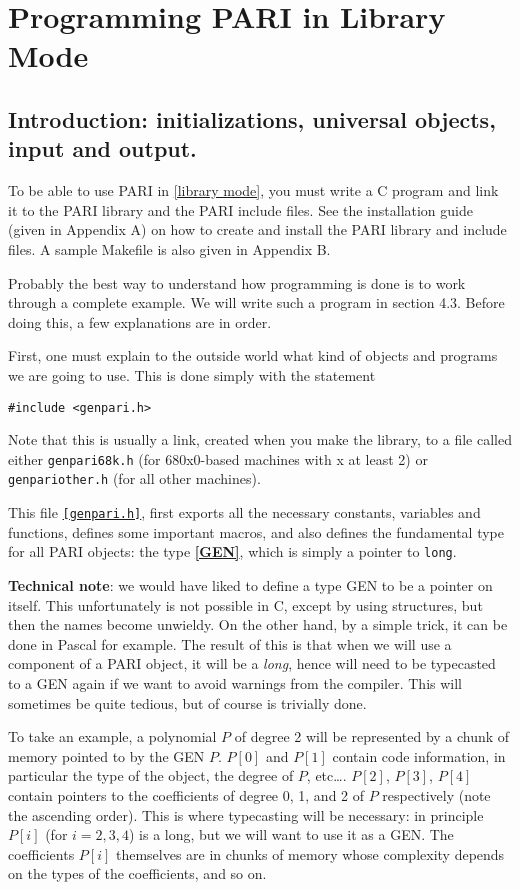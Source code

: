 \chapter{Programming PARI in Library Mode}

\section{Introduction: initializations, universal objects, input and output.}

To be able to use PARI in \ref{library mode}, you must write a C program and link it
to the PARI library and the PARI include files. See the installation guide 
(given in Appendix A) on how to create and install the PARI
library and include files. A sample Makefile is also given in Appendix B.

Probably the best way to understand how programming is done is to work
through a complete example. We will write such a program in section 4.3.
Before doing this, a few explanations are in order.


First, one must explain to the outside world what kind of objects and
programs we are going to use. This is done simply with the statement

{\tt \#include <genpari.h>}

Note that this is usually a link, created when you make the library, to
a file called either {\tt genpari68k.h} (for 680x0-based machines with x at
least 2) or {\tt genpariother.h} (for all other machines).

This file {\tt \ref{genpari.h}}, first exports all the necessary constants, variables
and functions, defines some important macros, and also defines the fundamental
type for all PARI objects: the type {\bf \ref{GEN}}, which is simply
a pointer to {\tt long}.

{\bf Technical note}: we would have liked to define a type GEN to be a
pointer on itself. This unfortunately is not possible in C, except by
using structures, but then the names become unwieldy. On the other hand,
by a simple trick, it can be done in Pascal for example. The result of this
is that when we will use a component of a PARI object, it will be a {\sl long},
hence will need to be typecasted to a GEN again if we want to avoid warnings
from the compiler. This will sometimes be quite tedious, but of course is
trivially done.

To take an example, a polynomial $P$ of degree 2 will be represented by a chunk
of memory pointed to by the GEN $P$. $P[0]$ and $P[1]$ contain code
information, in particular the type of the object, the degree of $P$, etc\dots.
$P[2]$, $P[3]$, $P[4]$ contain pointers to the coefficients of degree 0, 1,
and 2 of $P$ respectively (note the ascending order). This is where typecasting
will be necessary: in principle $P[i]$ (for $i=2,3,4$) is a long, but we will
want to use it as a GEN. 
The coefficients $P[i]$ themselves are in chunks of memory whose complexity
depends on the types of the coefficients, and so on.

